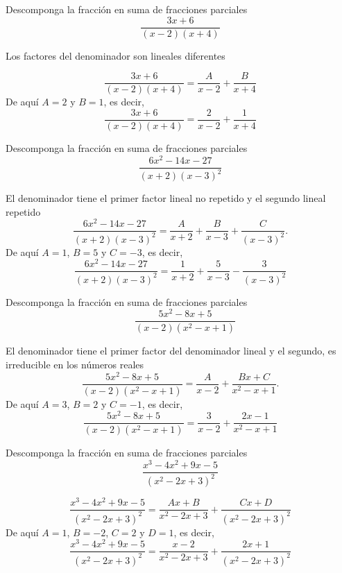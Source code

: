 \medskip

\begin{ejemplo}
Descomponga la fracci\'on en suma de fracciones
parciales
\[
\frac{3x+6}{(x-2)(x+4)}
\]


Los factores del denominador son lineales diferentes

$$\frac{3x+6}{(x-2)(x+ 4 )}= \frac{A}{x-2} + \frac{B}{x+4}$$
De aqu\'i $A=2$ y $B=1$, es decir,
$$ \frac{3x+6}{(x-2)(x+4)} = \frac{2}{x-2} + \frac{1}{x+4}$$

\end{ejemplo}


\begin{ejemplo}
Descomponga la fracci\'on en suma de fracciones
parciales
\[
\frac{6x^{2}-14x - 27}{(x+2)(x-3)^{2}}
\]


El denominador tiene el primer factor lineal no repetido y el segundo lineal repetido
\[
\frac{6x^{2}-14x -27}{(x+2)(x-3)^{2}} = \frac{A}{x+2} + \frac{B}{x-3} + \frac{C}{(x-3)^{2}}. 
\]
De aqu\'i $A=1$, $B=5$ y $C=-3$, es decir,
\[
\frac{6x^{2}-14x -27}{(x+2)(x-3)^{2}} = \frac{1}{x+2} + \frac{5}{x-3} - \frac{3}{(x-3) ^{2}}
\]
\end{ejemplo}


\begin{ejemplo}
Descomponga la fracci\'on en suma de fracciones
parciales
\[
\quad\displaystyle\frac{5x^{2}-8x + 5}{(x-2)(x^{2}-x+1)}
\]


El denominador tiene el primer factor del denominador lineal y el segundo, es
irreducible en los n\'umeros reales
$$\frac{5x^{2}-8x+5}{(x-2)(x^{2}-x+1)} = \frac{A}{x-2} + \frac{Bx+C}{x^{2}-x+1}. $$
De aqu\'i $A=3$, $B=2$ y $C=-1$, es decir,
\[
\frac{5x^{2}-8x+5}{(x-2)(x^{2}-x+1)} = \frac{3}{x-2} + \frac{2x-1}{x^{2}-x+1}
\]
\end{ejemplo}


\begin{ejemplo}

Descomponga la fracci\'on en suma de fracciones
parciales
\[
\frac{x^{3}-4x^{2}+9x-5}{(x^{2}- 2x + 3)^{2}}
\]

$$\frac{x^{3}-4x^{2}+9x -5}{(x^{2}-2x  +3)^{2}} = \frac{Ax +B}{x^{2}-2x+3} + \frac{Cx +D}{(x^{2}-2x +3)^{2}}$$
De aqu\'i $A=1$, $B=-2$, $C=2$ y  $D = 1$, es decir,
$$\frac{x^{3}- 4x^{2} + 9x - 5}{(x^{2}-2x+3)^{2}} = \frac{x-2}{x^{2}- 2x + 3} + \frac{2x+1}{(x^{2}-2x+3)^{2}}$$

\end{ejemplo}


